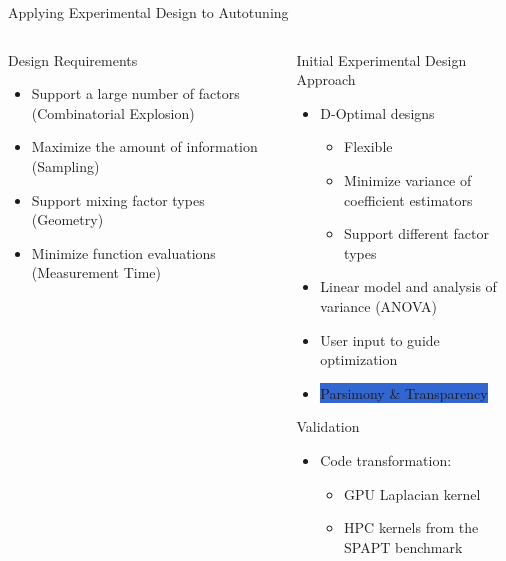\documentclass[10pt, compress, aspectratio=169, xcolor={table,usenames,dvipsnames}]{beamer}
\begin{document}
\begin{frame}[label={sec:org8d35656}]{Applying Experimental Design to Autotuning}
\begin{columns}
\begin{column}{0.45\columnwidth}
\begin{block}{Design Requirements}
\begin{itemize}
\item Support a large number of factors (\alert{Combinatorial Explosion})
\item Maximize the amount of information (\alert{Sampling})
\item Support mixing factor types (\alert{Geometry})
\item Minimize function evaluations (\alert{Measurement Time})
\end{itemize}
\end{block}
\end{column}

\begin{column}{0.55\columnwidth}
\begin{block}{Initial Experimental Design Approach}
\begin{itemize}
\item D-Optimal designs
\begin{itemize}
\item Flexible
\item Minimize variance of coefficient estimators
\item Support different factor types
\end{itemize}
\item Linear model and analysis of variance (ANOVA)
\item User input to guide optimization
\item \colorbox{Highlight}{\alert{Parsimony} \& \alert{Transparency}}
\end{itemize}

\begin{block}{Validation}
\begin{itemize}
\item Code transformation:
\begin{itemize}
\item GPU Laplacian kernel
\item HPC kernels from the SPAPT benchmark
\end{itemize}
\end{itemize}
\end{block}
\end{block}
\end{column}
\end{columns}
\end{frame}
\end{document}
